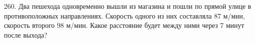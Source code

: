260. Два пешехода одновременно вышли из магазина и пошли по прямой улице в противоположных направлениях. Скорость одного из них составляла 87 м/мин, скорость второго 98 м/мин. Какое расстояние будет между ними через 7 минут после выхода?\\
